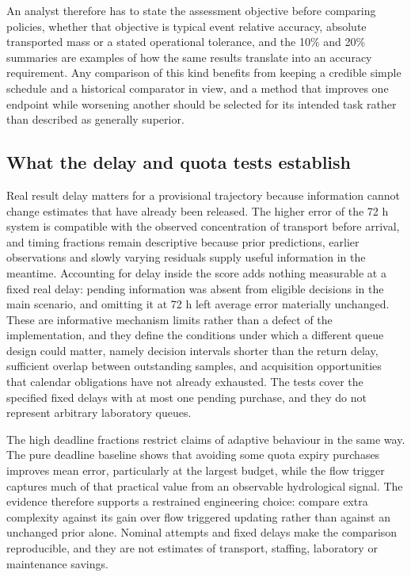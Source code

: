 \documentclass[lineno,pdflatex,sn-apa]{sn-jnl}%
\theoremstyle{thmstyleone}%
\theoremstyle{thmstyletwo}%
\theoremstyle{thmstylethree}%
\begin{document}
An analyst therefore has to state the assessment objective before comparing policies, whether that objective is typical event relative accuracy, absolute transported mass or a stated operational tolerance, and the 10\% and 20\% summaries are examples of how the same results translate into an accuracy requirement. Any comparison of this kind benefits from keeping a credible simple schedule and a historical comparator in view, and a method that improves one endpoint while worsening another should be selected for its intended task rather than described as generally superior.

\subsection{What the delay and quota tests establish}

Real result delay matters for a provisional trajectory because information cannot change estimates that have already been released. The higher error of the 72 h system is compatible with the observed concentration of transport before arrival, and timing fractions remain descriptive because prior predictions, earlier observations and slowly varying residuals supply useful information in the meantime. Accounting for delay inside the score adds nothing measurable at a fixed real delay: pending information was absent from eligible decisions in the main scenario, and omitting it at 72 h left average error materially unchanged. These are informative mechanism limits rather than a defect of the implementation, and they define the conditions under which a different queue design could matter, namely decision intervals shorter than the return delay, sufficient overlap between outstanding samples, and acquisition opportunities that calendar obligations have not already exhausted. The tests cover the specified fixed delays with at most one pending purchase, and they do not represent arbitrary laboratory queues.

The high deadline fractions restrict claims of adaptive behaviour in the same way. The pure deadline baseline shows that avoiding some quota expiry purchases improves mean error, particularly at the largest budget, while the flow trigger captures much of that practical value from an observable hydrological signal. The evidence therefore supports a restrained engineering choice: compare extra complexity against its gain over flow triggered updating rather than against an unchanged prior alone. Nominal attempts and fixed delays make the comparison reproducible, and they are not estimates of transport, staffing, laboratory or maintenance savings.
\end{document}
